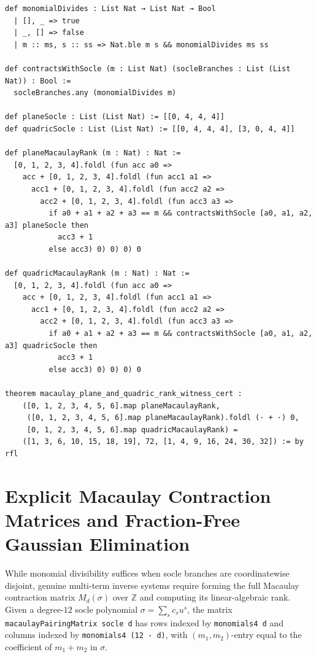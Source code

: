 \documentclass[11pt,a4paper]{article}
\begin{document}
\begin{lstlisting}[caption={Monomial divisibility and socle contraction rank evaluators in \texttt{ShiodaFormalConjectures.lean}.}]
def monomialDivides : List Nat → List Nat → Bool
  | [], _ => true
  | _, [] => false
  | m :: ms, s :: ss => Nat.ble m s && monomialDivides ms ss

def contractsWithSocle (m : List Nat) (socleBranches : List (List Nat)) : Bool :=
  socleBranches.any (monomialDivides m)

def planeSocle : List (List Nat) := [[0, 4, 4, 4]]
def quadricSocle : List (List Nat) := [[0, 4, 4, 4], [3, 0, 4, 4]]

def planeMacaulayRank (m : Nat) : Nat :=
  [0, 1, 2, 3, 4].foldl (fun acc a0 =>
    acc + [0, 1, 2, 3, 4].foldl (fun acc1 a1 =>
      acc1 + [0, 1, 2, 3, 4].foldl (fun acc2 a2 =>
        acc2 + [0, 1, 2, 3, 4].foldl (fun acc3 a3 =>
          if a0 + a1 + a2 + a3 == m && contractsWithSocle [a0, a1, a2, a3] planeSocle then
            acc3 + 1
          else acc3) 0) 0) 0) 0

def quadricMacaulayRank (m : Nat) : Nat :=
  [0, 1, 2, 3, 4].foldl (fun acc a0 =>
    acc + [0, 1, 2, 3, 4].foldl (fun acc1 a1 =>
      acc1 + [0, 1, 2, 3, 4].foldl (fun acc2 a2 =>
        acc2 + [0, 1, 2, 3, 4].foldl (fun acc3 a3 =>
          if a0 + a1 + a2 + a3 == m && contractsWithSocle [a0, a1, a2, a3] quadricSocle then
            acc3 + 1
          else acc3) 0) 0) 0) 0

theorem macaulay_plane_and_quadric_rank_witness_cert :
    ([0, 1, 2, 3, 4, 5, 6].map planeMacaulayRank,
     ([0, 1, 2, 3, 4, 5, 6].map planeMacaulayRank).foldl (· + ·) 0,
     [0, 1, 2, 3, 4, 5, 6].map quadricMacaulayRank) =
    ([1, 3, 6, 10, 15, 18, 19], 72, [1, 4, 9, 16, 24, 30, 32]) := by rfl
\end{lstlisting}

\section{Explicit Macaulay Contraction Matrices and Fraction-Free Gaussian Elimination}

While monomial divisibility suffices when socle branches are coordinatewise disjoint, genuine multi-term inverse systems require forming the full Macaulay contraction matrix $M_d(\sigma)$ over $\mathbb{Z}$ and computing its linear-algebraic rank. Given a degree-$12$ socle polynomial $\sigma = \sum_s c_s u^s$, the matrix \texttt{macaulayPairingMatrix socle d} has rows indexed by \texttt{monomials4 d} and columns indexed by \texttt{monomials4 (12 - d)}, with $(m_1, m_2)$-entry equal to the coefficient of $m_1 + m_2$ in $\sigma$.
\end{document}
